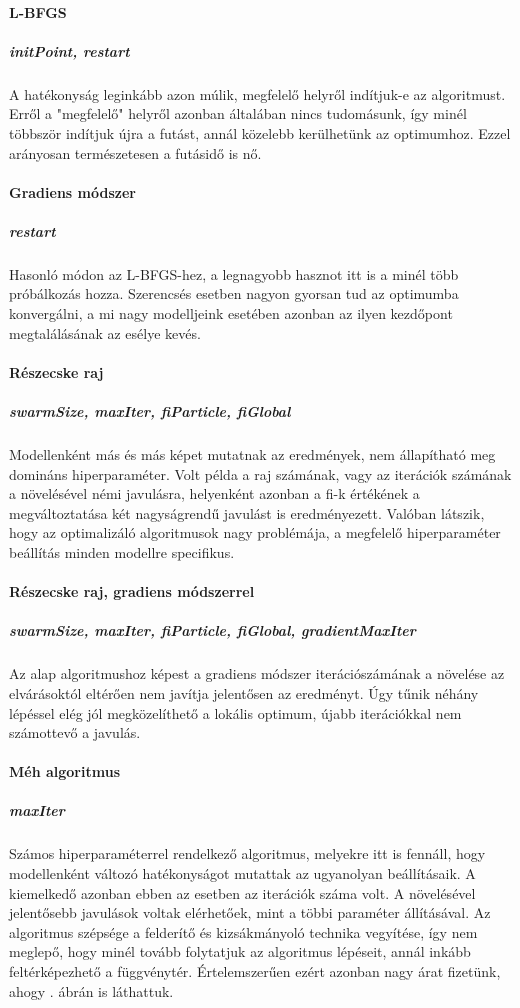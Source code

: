 \paragraph{L-BFGS} \subparagraph{initPoint, restart} A hatékonyság leginkább azon múlik, megfelelő helyről indítjuk-e az algoritmust. Erről a "megfelelő" helyről azonban általában nincs tudomásunk, így minél többször indítjuk újra a futást, annál közelebb kerülhetünk az optimumhoz. Ezzel arányosan természetesen a futásidő is nő.
\paragraph{Gradiens módszer}\subparagraph{restart} Hasonló módon az L-BFGS-hez, a legnagyobb hasznot itt is a minél több próbálkozás hozza. Szerencsés esetben nagyon gyorsan tud az optimumba konvergálni, a mi nagy modelljeink esetében azonban az ilyen kezdőpont megtalálásának az esélye kevés.
\paragraph{Részecske raj}\subparagraph{swarmSize, maxIter, fiParticle, fiGlobal} Modellenként más és más képet mutatnak az eredmények, nem állapítható meg domináns hiperparaméter. Volt példa a raj számának, vagy az iterációk számának a növelésével némi javulásra, helyenként azonban a fi-k értékének a megváltoztatása két nagyságrendű javulást is eredményezett. Valóban látszik, hogy az optimalizáló algoritmusok nagy problémája, a megfelelő hiperparaméter beállítás minden modellre specifikus.
\paragraph{Részecske raj, gradiens módszerrel}\subparagraph{swarmSize, maxIter, fiParticle, fiGlobal, gradientMaxIter} Az alap algoritmushoz képest a gradiens módszer iterációszámának a növelése az elvárásoktól eltérően nem javítja jelentősen az eredményt. Úgy tűnik néhány lépéssel elég jól megközelíthető a lokális optimum, újabb iterációkkal nem számottevő a javulás. 
\paragraph{Méh algoritmus}\subparagraph{maxIter} Számos hiperparaméterrel rendelkező algoritmus, melyekre itt is fennáll, hogy modellenként változó hatékonyságot mutattak az ugyanolyan beállításaik. A kiemelkedő azonban ebben az esetben az iterációk száma volt. A növelésével jelentősebb javulások voltak elérhetőek, mint a többi paraméter állításával. Az algoritmus szépsége a felderítő és kizsákmányoló technika vegyítése, így nem meglepő, hogy minél tovább folytatjuk az algoritmus lépéseit, annál inkább feltérképezhető a függvénytér. Értelemszerűen ezért azonban nagy árat fizetünk, ahogy . ábrán is láthattuk.
